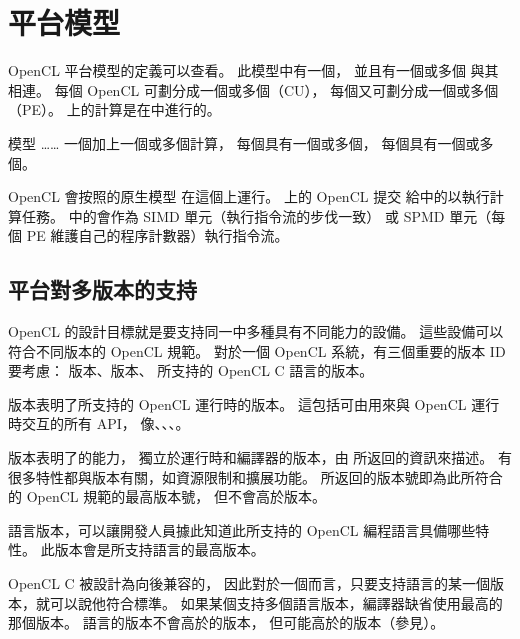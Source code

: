 \section{平台模型}

OpenCL 平台模型的定義可以查看。
此模型中有一個，
並且有一個或多個 {} 與其相連。
每個 OpenCL 可劃分成一個或多個（CU），
每個又可劃分成一個或多個（PE）。
上的計算是在中進行的。

\startbuffer[buffigplfmodelcaption]
模型 …… 一個加上一個或多個計算，
每個具有一個或多個，
每個具有一個或多個。
\stopbuffer

{}

OpenCL 會按照的原生模型
在這個上運行。
上的 OpenCL 提交
給中的以執行計算任務。
中的會作為 SIMD 單元（執行指令流的步伐一致）
或 SPMD 單元（每個 PE 維護自己的程序計數器）執行指令流。

\subsection{平台對多版本的支持}
OpenCL 的設計目標就是要支持同一中多種具有不同能力的設備。
這些設備可以符合不同版本的 OpenCL 規範。
對於一個 OpenCL 系統，有三個重要的版本 ID 要考慮：
版本、版本、
所支持的 OpenCL C 語言的版本。

版本表明了所支持的 OpenCL 運行時的版本。
這包括可由用來與 OpenCL 運行時交互的所有 API，
像、、、。

版本表明了的能力，
獨立於運行時和編譯器的版本，由  所返回的資訊來描述。
有很多特性都與版本有關，如資源限制和擴展功能。
所返回的版本號即為此所符合的 OpenCL 規範的最高版本號，
但不會高於版本。

語言版本，可以讓開發人員據此知道此所支持的 OpenCL 編程語言具備哪些特性。
此版本會是所支持語言的最高版本。

OpenCL C 被設計為向後兼容的，
因此對於一個而言，只要支持語言的某一個版本，就可以說他符合標準。
如果某個支持多個語言版本，編譯器缺省使用最高的那個版本。
語言的版本不會高於的版本，
但可能高於的版本（參見）。

